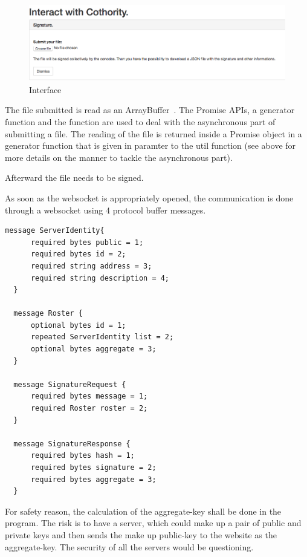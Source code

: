 \documentclass[11pt, a4paper, twoside, openright, openany]{article} %
\begin{document}
\begin{figure}[ht!]
\centering
\includegraphics[width=125mm]{verification_signature.jpg}
\caption{Interface}
\end{figure}

The file submitted is read as an ArrayBuffer~\cite{ArrayBuffer}. The Promise APIs,
a generator function and the  function are used to deal with
the asynchronous part of submitting a file. The reading of the file is returned
inside a Promise object in a generator function that is given in paramter to the
 util function (see above for more details on
the manner to tackle the asynchronous part). %

Afterward the file needs to be signed.

As soon as the websocket is appropriately opened, the communication is done through a websocket
using 4 protocol buffer messages.
\bigbreak

\begin{lstlisting}[caption={.proto file}, captionpos=b]
  message ServerIdentity{
      required bytes public = 1;
      required bytes id = 2;
      required string address = 3;
      required string description = 4;
  }

  message Roster {
      optional bytes id = 1;
      repeated ServerIdentity list = 2;
      optional bytes aggregate = 3;
  }

  message SignatureRequest {
      required bytes message = 1;
      required Roster roster = 2;
  }

  message SignatureResponse {
      required bytes hash = 1;
      required bytes signature = 2;
      required bytes aggregate = 3;
  }
\end{lstlisting}

For safety reason, the calculation of the aggregate-key shall be done in the program.
The risk is to have a server, which could make up a pair of public and private keys and
then sends the make up public-key to the website as the aggregate-key. The security of
all the servers would be questioning.
\smallbreak
\end{document}

